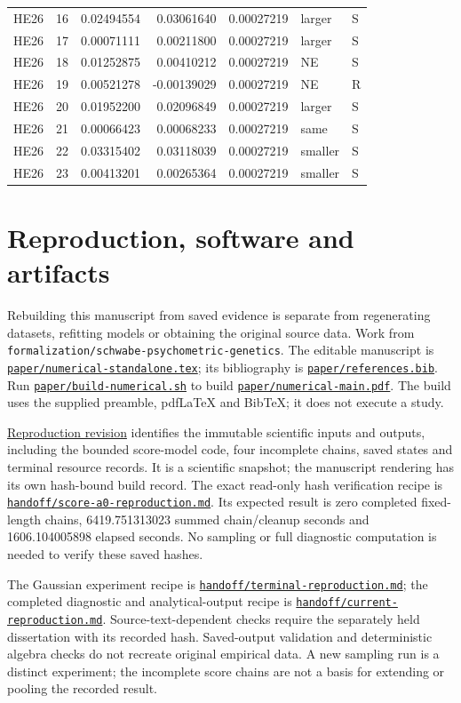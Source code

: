 \documentclass[11pt]{article}
\newcommand{\file}[1]{\href{https://github.com/alectionary/vibe-math/blob/master/formalization/schwabe-psychometric-genetics/#1}{\nolinkurl{#1}}}
\begin{document}
{\begin{longtable}{llrrrll}
HE26 & 16 & 0.02494554 & 0.03061640 & 0.00027219 & larger & S\\
HE26 & 17 & 0.00071111 & 0.00211800 & 0.00027219 & larger & S\\
HE26 & 18 & 0.01252875 & 0.00410212 & 0.00027219 & NE & S\\
HE26 & 19 & 0.00521278 & -0.00139029 & 0.00027219 & NE & R\\
HE26 & 20 & 0.01952200 & 0.02096849 & 0.00027219 & larger & S\\
HE26 & 21 & 0.00066423 & 0.00068233 & 0.00027219 & same & S\\
HE26 & 22 & 0.03315402 & 0.03118039 & 0.00027219 & smaller & S\\
HE26 & 23 & 0.00413201 & 0.00265364 & 0.00027219 & smaller & S\\
\bottomrule\end{longtable}}
\section{Reproduction, software and artifacts}\label{sec:reproduction}
Rebuilding this manuscript from saved evidence is separate from regenerating datasets, refitting models or obtaining the original source data. Work from \nolinkurl{formalization/schwabe-psychometric-genetics}. The editable manuscript is \file{paper/numerical-standalone.tex}; its bibliography is \file{paper/references.bib}. Run \file{paper/build-numerical.sh} to build \file{paper/numerical-main.pdf}. The build uses the supplied preamble, pdfLaTeX and BibTeX; it does not execute a study.

\href{https://github.com/alectionary/vibe-math/commit/7ddf23f40124239a8f245de7c71540b0c80216bf}{Reproduction revision} identifies the immutable scientific inputs and outputs, including the bounded score-model code, four incomplete chains, saved states and terminal resource records. It is a scientific snapshot; the manuscript rendering has its own hash-bound build record. The exact read-only hash verification recipe is \file{handoff/score-a0-reproduction.md}. Its expected result is zero completed fixed-length chains, 6419.751313023 summed chain/cleanup seconds and 1606.104005898 elapsed seconds. No sampling or full diagnostic computation is needed to verify these saved hashes.

The Gaussian experiment recipe is \file{handoff/terminal-reproduction.md}; the completed diagnostic and analytical-output recipe is \file{handoff/current-reproduction.md}. Source-text-dependent checks require the separately held dissertation with its recorded hash. Saved-output validation and deterministic algebra checks do not recreate original empirical data. A new sampling run is a distinct experiment; the incomplete score chains are not a basis for extending or pooling the recorded result.
\end{document}
